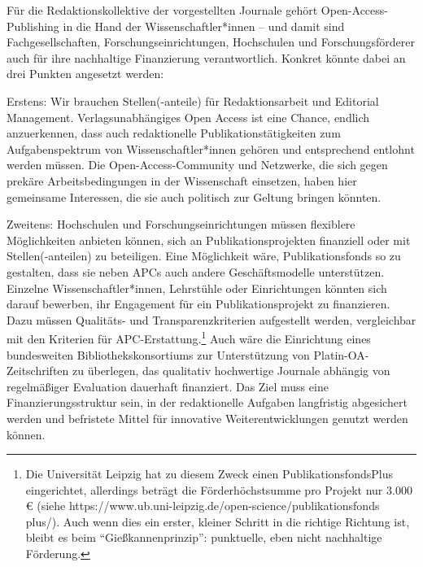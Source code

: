 \documentclass[a4paper,
fontsize=11pt,
oneside,
numbers=noperiodatend,
parskip=half-,
bibliography=totoc,
final
]{scrartcl}
\begin{document}
Für die Redaktionskollektive der vorgestellten Journale gehört
Open-Access-Publishing in die Hand der Wissenschaftler*innen -- und
damit sind Fachgesellschaften, Forschungseinrichtungen, Hochschulen und
Forschungsförderer auch für ihre nachhaltige Finanzierung
verantwortlich. Konkret könnte dabei an drei Punkten angesetzt werden:

Erstens: Wir brauchen Stellen(-anteile) für Redaktionsarbeit und
Editorial Management. Verlagsunabhängiges Open Access ist eine Chance,
endlich anzuerkennen, dass auch redaktionelle Publikationstätigkeiten
zum Aufgabenspektrum von Wissenschaftler*innen gehören und entsprechend
entlohnt werden müssen. Die Open-Access-Community und Netzwerke, die
sich gegen prekäre Arbeitsbedingungen in der Wissenschaft einsetzen,
haben hier gemeinsame Interessen, die sie auch politisch zur Geltung
bringen könnten.

Zweitens: Hochschulen und Forschungseinrichtungen müssen flexiblere
Möglichkeiten anbieten können, sich an Publikationsprojekten finanziell
oder mit Stellen(-anteilen) zu beteiligen. Eine Möglichkeit wäre,
Publikationsfonds so zu gestalten, dass sie neben APCs auch andere
Geschäftsmodelle unterstützen. Einzelne Wissenschaftler*innen,
Lehrstühle oder Einrichtungen könnten sich darauf bewerben, ihr
Engagement für ein Publikationsprojekt zu finanzieren. Dazu müssen
Qualitäts- und Transparenzkriterien aufgestellt werden, vergleichbar mit
den Kriterien für APC-Erstattung.\footnote{Die Universität Leipzig hat
  zu diesem Zweck einen PublikationsfondsPlus eingerichtet, allerdings
  beträgt die Förderhöchstsumme pro Projekt nur 3.000 € (siehe
  https://www.ub.uni-leipzig.de/open-science/publikationsfonds plus/).
  Auch wenn dies ein erster, kleiner Schritt in die richtige Richtung
  ist, bleibt es beim \enquote{Gießkannenprinzip}: punktuelle, eben
  nicht nachhaltige Förderung.} Auch wäre die Einrichtung eines
bundesweiten Bibliothekskonsortiums zur Unterstützung von
Platin-OA-Zeitschriften zu überlegen, das qualitativ hochwertige
Journale abhängig von regelmäßiger Evaluation dauerhaft finanziert. Das
Ziel muss eine Finanzierungsstruktur sein, in der redaktionelle Aufgaben
langfristig abgesichert werden und befristete Mittel für innovative
Weiterentwicklungen genutzt werden können.
\end{document}
